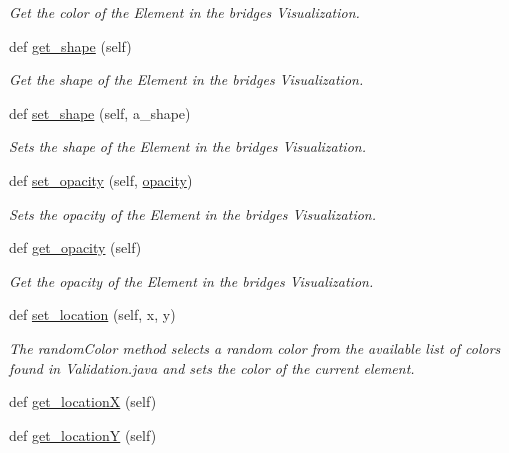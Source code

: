 \begin{DoxyCompactItemize}
\begin{DoxyCompactList}\small\item\em Get the color of the Element in the bridges Visualization. \end{DoxyCompactList}\item 
def \mbox{\hyperlink{class_bridges_1_1element__visualizer_1_1_element_visualizer_af897973bc87f21bb93149a820d6f32f5}{get\+\_\+shape}} (self)
\begin{DoxyCompactList}\small\item\em Get the shape of the Element in the bridges Visualization. \end{DoxyCompactList}\item 
def \mbox{\hyperlink{class_bridges_1_1element__visualizer_1_1_element_visualizer_a577c5842df4a7156bca91b19a8b1ccd5}{set\+\_\+shape}} (self, a\+\_\+shape)
\begin{DoxyCompactList}\small\item\em Sets the shape of the Element in the bridges Visualization. \end{DoxyCompactList}\item 
def \mbox{\hyperlink{class_bridges_1_1element__visualizer_1_1_element_visualizer_a16a1f22e7033c940d7b9cd5b4d0bc67c}{set\+\_\+opacity}} (self, \mbox{\hyperlink{class_bridges_1_1element__visualizer_1_1_element_visualizer_a8c32a4ec0b2de8d90dc9ba32a60d3d31}{opacity}})
\begin{DoxyCompactList}\small\item\em Sets the opacity of the Element in the bridges Visualization. \end{DoxyCompactList}\item 
def \mbox{\hyperlink{class_bridges_1_1element__visualizer_1_1_element_visualizer_a6976f47d3efbec8f7143ff865590c717}{get\+\_\+opacity}} (self)
\begin{DoxyCompactList}\small\item\em Get the opacity of the Element in the bridges Visualization. \end{DoxyCompactList}\item 
def \mbox{\hyperlink{class_bridges_1_1element__visualizer_1_1_element_visualizer_ad383e4865437f64afa039924658d49ba}{set\+\_\+location}} (self, x, y)
\begin{DoxyCompactList}\small\item\em The random\+Color method selects a random color from the available list of colors found in Validation.\+java and sets the color of the current element. \end{DoxyCompactList}\item 
def \mbox{\hyperlink{class_bridges_1_1element__visualizer_1_1_element_visualizer_a25986dc0ad3ec89dd8a933bd4ff782cc}{get\+\_\+locationX}} (self)
\item 
def \mbox{\hyperlink{class_bridges_1_1element__visualizer_1_1_element_visualizer_a5edeca0b69cd6c4457148170058147f1}{get\+\_\+locationY}} (self)
\end{DoxyCompactItemize}
